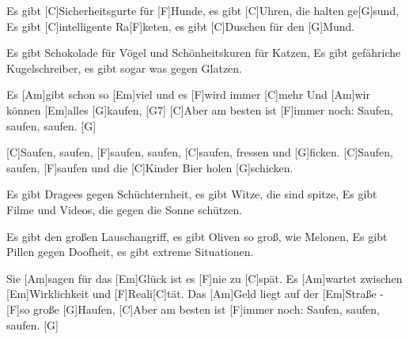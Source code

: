 

\begin{guitar}
	Es gibt [C]Sicherheitsgurte für [F]Hunde, es gibt [C]Uhren, die halten ge[G]sund,
	Es gibt [C]intelligente Ra[F]keten, es gibt [C]Duschen für den [G]Mund.
	
	Es gibt Schokolade für Vögel und Schönheitskuren für Katzen,
	Es gibt gefähriche Kugelschreiber, es gibt sogar was gegen Glatzen.
	
	Es [Am]gibt schon so [Em]viel und es [F]wird immer [C]mehr
	Und [Am]wir können [Em]alles [G]kaufen, [G7]{}
	[C]Aber am besten ist [F]immer noch: Saufen, saufen, saufen. [G]{}
	
	[C]Saufen, saufen, [F]saufen, saufen, [C]saufen, fressen und [G]ficken.
	[C]Saufen, saufen, [F]saufen und die [C]Kinder Bier holen [G]schicken.
	
	Es gibt Dragees gegen Schüchternheit, es gibt Witze, die sind spitze,
	Es gibt Filme und Videos, die gegen die Sonne schützen.
	
	Es gibt den großen Lauschangriff, es gibt Oliven so groß, wie Melonen,
	Es gibt Pillen gegen Doofheit, es gibt extreme Situationen.
	
	 
	
	 
	
	Sie [Am]sagen für das [Em]Glück ist es [F]nie zu [C]spät.
	Es [Am]wartet zwischen [Em]Wirklichkeit und [F]Reali[C]tät.
	Das [Am]Geld liegt auf der [Em]Straße - [F]so große [G]Haufen,
	[C]Aber am besten ist [F]immer noch: Saufen, saufen, saufen. [G]{}
	
	 
\end{guitar}